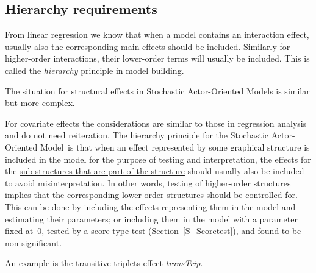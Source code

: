 \documentclass[a4paper,fleqn,11pt]{article}
\newcommand{\+}{\, + \,}
\newcommand{\saom}{{Stochastic Actor-Oriented Model}}
\begin{document}
\subsection{Hierarchy requirements}

From linear regression we know that when a model contains an interaction
effect, usually also the corresponding main effects should be included.
Similarly for higher-order interactions, their lower-order terms
will usually be included.
This is called the \emph{hierarchy} principle in model building.

The situation for structural effects in {\saom}s is similar but more complex.

For covariate effects the considerations are similar to those
in regression analysis and do not need reiteration.
The hierarchy principle for the \saom\ is that when an effect
represented by some graphical structure is included in the model
for the purpose of testing and interpretation,
the effects for the \underline{sub-structures that are part of the
structure} should usually also be included to avoid misinterpretation.
In other words, testing of higher-order structures implies that
the corresponding lower-order structures should be controlled for.
This can be done by including the effects representing them
in the model and estimating their parameters;
or including them in the model with a parameter fixed at~0,
tested by a score-type test (Section~\ref{S_Scoretest}),
and found to be non-significant.


An example is the transitive triplets effect \textit{transTrip}.
\end{document}

